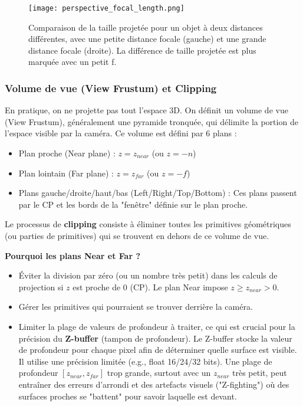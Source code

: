 \documentclass{article}
\begin{document}
\begin{figure}[H]
\centering
\texttt{[image: perspective\_focal\_length.png]}
\caption{Comparaison de la taille projetée pour un objet à deux distances différentes, avec une petite distance focale (gauche) et une grande distance focale (droite). La différence de taille projetée est plus marquée avec un petit f.}
\label{fig:perspective_focal_length}
\end{figure}


\subsubsection{Volume de vue (View Frustum) et Clipping}
En pratique, on ne projette pas tout l'espace 3D. On définit un volume de vue (View Frustum), généralement une pyramide tronquée, qui délimite la portion de l'espace visible par la caméra.
Ce volume est défini par 6 plans :
\begin{itemize}
    \item Plan proche (Near plane) : $z = z_{near}$ (ou $z = -n$)
    \item Plan lointain (Far plane) : $z = z_{far}$ (ou $z = -f$)
    \item Plans gauche/droite/haut/bas (Left/Right/Top/Bottom) : Ces plans passent par le CP et les bords de la "fenêtre" définie sur le plan proche.
\end{itemize}
Le processus de \textbf{clipping} consiste à éliminer toutes les primitives géométriques (ou parties de primitives) qui se trouvent en dehors de ce volume de vue.

\textbf{Pourquoi les plans Near et Far ?}
\begin{itemize}
    \item Éviter la division par zéro (ou un nombre très petit) dans les calculs de projection si $z$ est proche de 0 (CP). Le plan Near impose $z \ge z_{near} > 0$.
    \item Gérer les primitives qui pourraient se trouver derrière la caméra.
    \item Limiter la plage de valeurs de profondeur à traiter, ce qui est crucial pour la précision du \textbf{Z-buffer} (tampon de profondeur). Le Z-buffer stocke la valeur de profondeur pour chaque pixel afin de déterminer quelle surface est visible. Il utilise une précision limitée (e.g., float 16/24/32 bits). Une plage de profondeur $[z_{near}, z_{far}]$ trop grande, surtout avec un $z_{near}$ très petit, peut entraîner des erreurs d'arrondi et des artefacts visuels ("Z-fighting") où des surfaces proches se "battent" pour savoir laquelle est devant.
\end{itemize}
\end{document}
